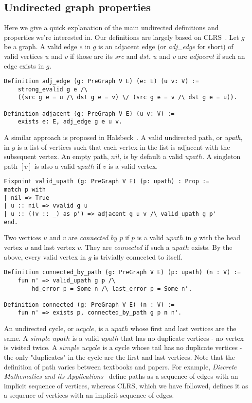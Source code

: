 \subsection{Undirected graph properties}

Here we give a quick explanation of the main undirected definitions and properties we're interested in. Our definitions are largely based on CLRS~\cite{clrs}.
\newline\newline
Let $g$ be a graph. A valid edge $e$ in $g$ is an adjacent edge (or \textit{adj\_edge} for short) of valid vertices $u$ and $v$ if those are its $src$ and $dst$. $u$ and $v$ are \textit{adjacent} if such an edge exists in $g$.
\begin{lstlisting}
Definition adj_edge (g: PreGraph V E) (e: E) (u v: V) :=
	strong_evalid g e /\
	((src g e = u /\ dst g e = v) \/ (src g e = v /\ dst g e = u)).

Definition adjacent (g: PreGraph V E) (u v: V) :=
	exists e: E, adj_edge g e u v.
\end{lstlisting}
A similar approach is proposed in Halsbeck~\cite{DBLP:journals/afp/HaslbeckLB19}.
\newline\newline
A valid undirected path, or \textit{upath}, in $g$ is a list of vertices such that each vertex in the list is adjacent with the subsequent vertex. An empty path, $nil$, is by default a valid $upath$. A singleton path $[v]$ is also a valid $upath$ if $v$ is a valid vertex.
\begin{lstlisting}
Fixpoint valid_upath (g: PreGraph V E) (p: upath) : Prop :=
match p with
| nil => True
| u :: nil => vvalid g u
| u :: ((v :: _) as p') => adjacent g u v /\ valid_upath g p'
end.
\end{lstlisting}
Two vertices $u$ and $v$ are \textit{connected by p} if $p$ is a valid $upath$ in $g$ with the head vertex $u$ and last vertex $v$. They are \textit{connected} if such a $upath$ exists. By the above, every valid vertex in $g$ is trivially connected to itself.
\begin{lstlisting}
Definition connected_by_path (g: PreGraph V E) (p: upath) (n : V) :=
	fun n' => valid_upath g p /\
		hd_error p = Some n /\ last_error p = Some n'.

Definition connected (g: PreGraph V E) (n : V) :=
	fun n' => exists p, connected_by_path g p n n'.
\end{lstlisting}
An undirected cycle, or $ucycle$, is a $upath$ whose first and last vertices are the same. A $simple$ $upath$ is a valid $upath$ that has no duplicate vertices - no vertex is visited twice. A $simple$ $ucycle$ is a cycle whose tail has no duplicate vertices - the only "duplicates" in the cycle are the first and last vertices.
\newline\newline
Note that the definition of path varies between textbooks and papers. For example, \textit{Discrete Mathematics and its Applications}~\cite{rozen} define paths as a sequence of edges with an implicit sequence of vertices, whereas CLRS, which we have followed, defines it as a sequence of vertices with an implicit sequence of edges.

